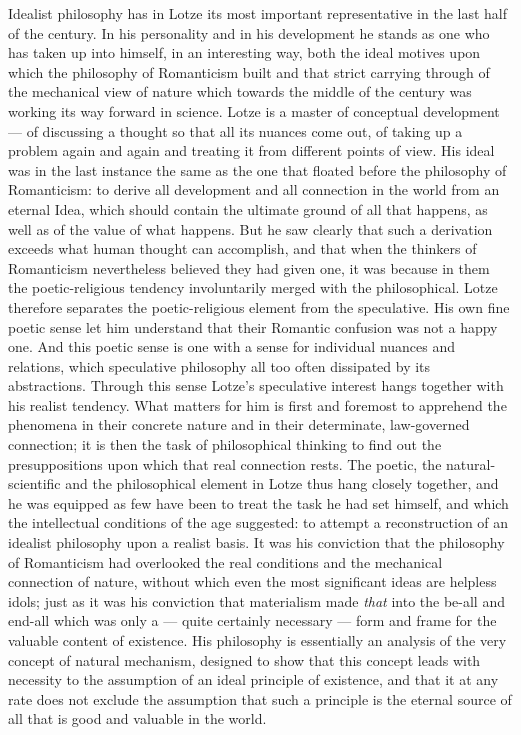 \documentclass[12pt,a4paper]{book}
\newcommand{\opage}[1]{\marginnote{\footnotesize\textit{[#1]}}}
\begin{document}
Idealist philosophy has in Lotze its most important representative in the last
half of the century. In his personality and in his development he stands as one
who has taken up into himself, in an interesting way, both the ideal motives
upon which the philosophy of Romanticism built and that strict carrying through
of the mechanical view of nature which towards the middle of the century was
working its way forward in science. Lotze is a master of conceptual development
--- of discussing a thought so that all its nuances come out, of taking up a
problem again and again and treating it from different points of view. His ideal
was in the last instance the same as the one that floated before the philosophy
of Romanticism: to derive all development and all connection in the world from
an eternal Idea, which should contain the ultimate ground of all that happens,
as well as of the value of what happens. But he saw clearly that such a
derivation exceeds what human thought can accomplish, and that when the thinkers
of Romanticism nevertheless believed they had given one, it was because in them
the poetic-religious tendency involuntarily merged with the philosophical. Lotze
therefore separates the poetic-religious element from the speculative. His own
fine poetic sense let him understand that their Romantic confusion was not a
happy one. And this poetic sense is one with a sense for individual nuances and
relations, which speculative philosophy all too often dissipated by its
abstractions. Through this sense Lotze's speculative interest hangs together
with his \opage{510}realist tendency. What matters for him is first and foremost to
apprehend the phenomena in their concrete nature and in their determinate,
law-governed connection; it is then the task of philosophical thinking to find
out the presuppositions upon which that real connection rests. The poetic, the
natural-scientific and the philosophical element in Lotze thus hang closely
together, and he was equipped as few have been to treat the task he had set
himself, and which the intellectual conditions of the age suggested: to attempt
a reconstruction of an idealist philosophy upon a realist basis. It was his
conviction that the philosophy of Romanticism had overlooked the real conditions
and the mechanical connection of nature, without which even the most significant
ideas are helpless idols; just as it was his conviction that materialism made
\emph{that} into the be-all and end-all which was only a --- quite certainly
necessary --- form and frame for the valuable content of existence. His
philosophy is essentially an analysis of the very concept of natural mechanism,
designed to show that this concept leads with necessity to the assumption of an
ideal principle of existence, and that it at any rate does not exclude the
assumption that such a principle is the eternal source of all that is good and
valuable in the world.
\end{document}
